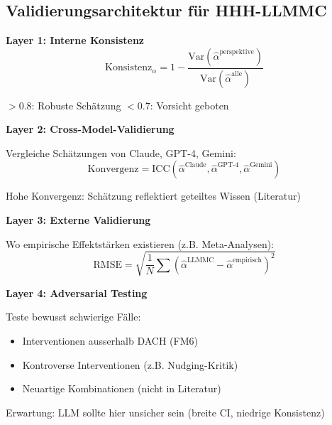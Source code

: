 \subsection{Validierungsarchitektur für HHH-LLMMC}

\begin{tcolorbox}[colback=gray!5!white, colframe=gray!75!black,
    title=\textbf{Vier-Schicht-Validierung (aus AN adaptiert)}]

\textbf{Layer 1: Interne Konsistenz}
\begin{equation}
\text{Konsistenz}_{\alpha} = 1 - \frac{\text{Var}(\hat{\alpha}^{\text{perspektive}})}{\text{Var}(\hat{\alpha}^{\text{alle}})}
\end{equation}

$> 0.8$: Robuste Schätzung \quad $< 0.7$: Vorsicht geboten

\medskip
\textbf{Layer 2: Cross-Model-Validierung}

Vergleiche Schätzungen von Claude, GPT-4, Gemini:
\begin{equation}
\text{Konvergenz} = \text{ICC}(\hat{\alpha}^{\text{Claude}}, \hat{\alpha}^{\text{GPT-4}}, \hat{\alpha}^{\text{Gemini}})
\end{equation}

Hohe Konvergenz: Schätzung reflektiert geteiltes Wissen (Literatur)

\medskip
\textbf{Layer 3: Externe Validierung}

Wo empirische Effektstärken existieren (z.B. Meta-Analysen):
\begin{equation}
\text{RMSE} = \sqrt{\frac{1}{N} \sum (\hat{\alpha}^{\text{LLMMC}} - \hat{\alpha}^{\text{empirisch}})^2}
\end{equation}

\medskip
\textbf{Layer 4: Adversarial Testing}

Teste bewusst schwierige Fälle:
\begin{itemize}[nosep]
    \item Interventionen ausserhalb DACH (FM6)
    \item Kontroverse Interventionen (z.B. Nudging-Kritik)
    \item Neuartige Kombinationen (nicht in Literatur)
\end{itemize}

Erwartung: LLM sollte hier unsicher sein (breite CI, niedrige Konsistenz)

\end{tcolorbox}

